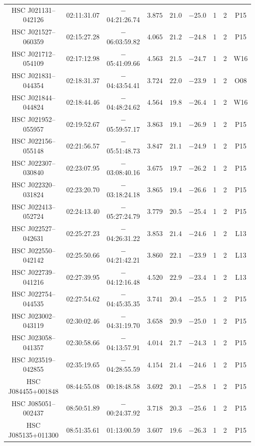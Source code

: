 \documentclass[]{pasj01}
\begin{document}
{\begin{longtable}{ccccccccc}
HSC J021131--042126 & 02:11:31.07 & $-$04:21:26.74 & $3.875$ & $21.0$ & $-25.0$ & 1 & 2 & P15 \\
HSC J021527--060359 & 02:15:27.28 & $-$06:03:59.82 & $4.065$ & $21.2$ & $-24.8$ & 1 & 2 & P15 \\
HSC J021712--054109 & 02:17:12.98 & $-$05:41:09.66 & $4.563$ & $21.5$ & $-24.7$ & 1 & 2 & W16 \\
HSC J021831--044354 & 02:18:31.37 & $-$04:43:54.41 & $3.724$ & $22.0$ & $-23.9$ & 1 & 2 & O08 \\
HSC J021844--044824 & 02:18:44.46 & $-$04:48:24.62 & $4.564$ & $19.8$ & $-26.4$ & 1 & 2 & W16 \\
HSC J021952--055957 & 02:19:52.67 & $-$05:59:57.17 & $3.863$ & $19.1$ & $-26.9$ & 1 & 2 & P15 \\
HSC J022156--055148 & 02:21:56.57 & $-$05:51:48.73 & $3.847$ & $21.1$ & $-24.9$ & 1 & 2 & P15 \\
HSC J022307--030840 & 02:23:07.95 & $-$03:08:40.16 & $3.675$ & $19.7$ & $-26.2$ & 1 & 2 & P15 \\
HSC J022320--031824 & 02:23:20.70 & $-$03:18:24.18 & $3.865$ & $19.4$ & $-26.6$ & 1 & 2 & P15 \\
HSC J022413--052724 & 02:24:13.40 & $-$05:27:24.79 & $3.779$ & $20.5$ & $-25.4$ & 1 & 2 & P15 \\
HSC J022527--042631 & 02:25:27.23 & $-$04:26:31.22 & $3.853$ & $21.4$ & $-24.6$ & 1 & 2 & L13 \\
HSC J022550--042142 & 02:25:50.66 & $-$04:21:42.21 & $3.860$ & $22.1$ & $-23.9$ & 1 & 2 & L13 \\
HSC J022739--041216 & 02:27:39.95 & $-$04:12:16.48 & $4.520$ & $22.9$ & $-23.4$ & 1 & 2 & L13 \\
HSC J022754--044535 & 02:27:54.62 & $-$04:45:35.35 & $3.741$ & $20.4$ & $-25.5$ & 1 & 2 & P15 \\
HSC J023002--043119 & 02:30:02.46 & $-$04:31:19.70 & $3.658$ & $20.9$ & $-25.0$ & 1 & 2 & P15 \\
HSC J023058--041357 & 02:30:58.66 & $-$04:13:57.91 & $4.014$ & $21.7$ & $-24.3$ & 1 & 2 & P15 \\
HSC J023519--042855 & 02:35:19.65 & $-$04:28:55.59 & $4.154$ & $21.4$ & $-24.6$ & 1 & 2 & P15 \\
HSC J084455+001848 & 08:44:55.08 & 00:18:48.58 & $3.692$ & $20.1$ & $-25.8$ & 1 & 2 & P15 \\
HSC J085051--002437 & 08:50:51.89 & $-$00:24:37.92 & $3.718$ & $20.3$ & $-25.6$ & 1 & 2 & P15 \\
HSC J085135+011300 & 08:51:35.61 & 01:13:00.59 & $3.607$ & $19.6$ & $-26.3$ & 1 & 2 & P15 \\

\end{longtable}}
\end{document}
